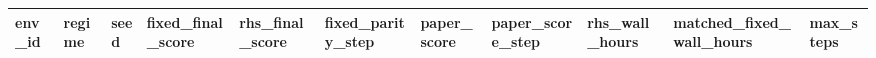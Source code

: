 \begin{tabular}{lllllllllll}
\toprule
env\_id & regime & seed & fixed\_final\_score & rhs\_final\_score & fixed\_parity\_step & paper\_score & paper\_score\_step & rhs\_wall\_hours & matched\_fixed\_wall\_hours & max\_steps \\
\midrule
\bottomrule
\end{tabular}
